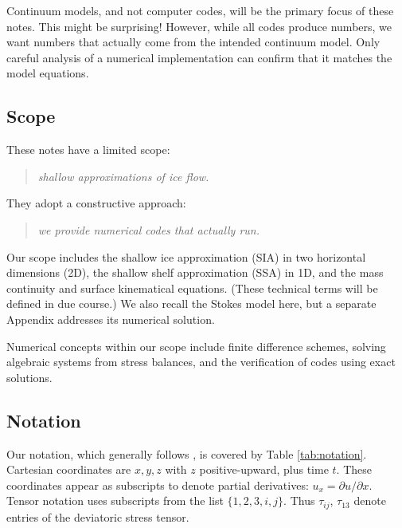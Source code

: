 \documentclass[letterpaper,final,12pt,reqno]{amsart}
\begin{document}
Continuum models, and not computer codes, will be the primary focus of these notes.  This might be surprising!  However, while all codes produce numbers, we want numbers that actually come from the intended continuum model.  Only careful analysis of a numerical implementation can confirm that it matches the model equations.

\subsection*{Scope}  These notes have a limited scope:
  \begin{quote}\emph{shallow approximations of ice flow.}\end{quote}
They adopt a constructive approach:
  \begin{quote}\emph{we provide numerical codes that actually run.}\end{quote}

Our scope includes the shallow ice approximation (SIA) in two horizontal dimensions (2D), the shallow shelf approximation (SSA) in 1D, and the mass continuity and surface kinematical equations.  (These technical terms will be defined in due course.)  We also recall the Stokes model here, but a separate Appendix addresses its numerical solution.

Numerical concepts within our scope include finite difference schemes, solving algebraic systems from stress balances, and the verification of codes using exact solutions.

\subsection*{Notation}  Our notation, which generally follows \cite{GreveBlatter2009}, is covered by Table \ref{tab:notation}.  Cartesian coordinates are $x,y,z$ with $z$ positive-upward, plus time $t$.  These coordinates appear as subscripts to denote partial derivatives: $u_x = \partial u/\partial x$.  Tensor notation uses subscripts from the list $\{1,2,3,i,j\}$.  Thus $\tau_{ij}$, $\tau_{13}$ denote entries of the deviatoric stress tensor.
\end{document}
